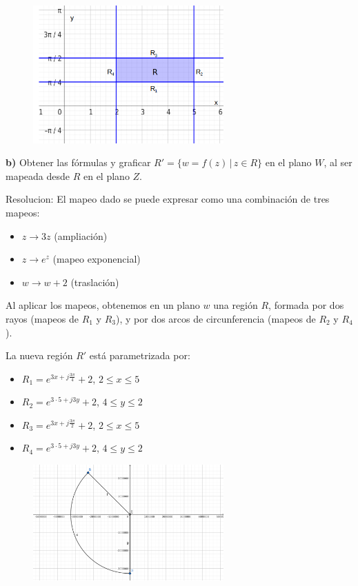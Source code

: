 \documentclass[12pt,a4paper]{report}
\begin{document}
\begin{figure}[h] %
    \centering %
    \includegraphics[width=0.65\textwidth]{./Imagenes/foto1Ej4.png} %
\end{figure}

\textbf{b)} Obtener las fórmulas y graficar $R' = \{w = f(z) \, | \, z \in R\}$ en el plano $W$, al ser mapeada desde $R$ en el plano $Z$.

Resolucion:
El mapeo dado se puede expresar como una combinación de tres mapeos:

\begin{itemize}
    \item $z \rightarrow 3z$ (ampliación)
    \item $z \rightarrow e^z$ (mapeo exponencial)
    \item $w \rightarrow w + 2$ (traslación)
\end{itemize}

Al aplicar los mapeos, obtenemos en un plano $w$ una región $R$, formada por dos rayos (mapeos de $R_1$ y $R_3$), y por dos arcos de circunferencia (mapeos de $R_2$ y $R_4$).

La nueva región $R'$ está parametrizada por:
\begin{itemize}
    \item $R_1 = e^{3x+j\frac{3\pi}{4}} + 2$, $2 \leq x \leq 5$
    \item $R_2 = e^{3 \cdot 5+j3y} + 2$, $4 \leq y \leq 2$
    \item $R_3 = e^{3x+j\frac{3\pi}{2}} + 2$, $2 \leq x \leq 5$
    \item $R_4 = e^{3 \cdot 5+j3y} + 2$, $4 \leq y \leq 2$
\end{itemize}


\begin{figure}[h] %
    \centering %
    \includegraphics[width=0.65\textwidth]{./Imagenes/foto2Ej4.png} %
\end{figure}
\end{document}
